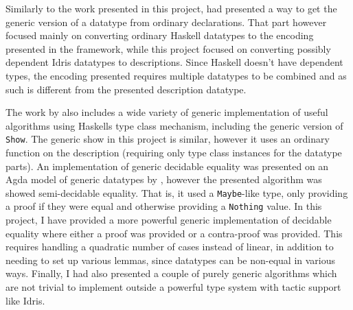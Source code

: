 \documentclass{ituthesis}
\newcommand{\ttconstructor}[1]{\textcolor{constructor-color}{\texttt{#1}}}
\newcommand{\tttype}[1]{\textcolor{type-color}{\texttt{#1}}}
\theoremstyle{break}
\begin{document}
Similarly to the work presented in this project, \citeauthor{magalhaes2012less} had presented a way to get the generic version of a datatype from ordinary declarations.
That part however focused mainly on converting ordinary Haskell datatypes to the encoding presented in the framework, while this project focused on converting possibly dependent Idris datatypes to descriptions.
Since Haskell doesn't have dependent types, the encoding presented requires multiple datatypes to be combined and as such is different from the presented description datatype.

The work by \citeauthor{magalhaes2012less} also includes a wide variety of generic implementation of useful algorithms using Haskells type class mechanism, including the generic version of \tttype{Show}.
The generic show in this project is similar, however it uses an ordinary function on the description (requiring only type class instances for the datatype parts).
An implementation of generic decidable equality was presented on an Agda model of generic datatypes by \citeauthor{magalhaes2012less}, however the presented algorithm was showed semi-decidable equality.
That is, it used a \tttype{Maybe}-like type, only providing a proof if they were equal and otherwise providing a \ttconstructor{Nothing} value.
In this project, I have provided a more powerful generic implementation of decidable equality where either a proof was provided or a contra-proof was provided.
This requires handling a quadratic number of cases instead of linear, in addition to needing to set up various lemmas, since datatypes can be non-equal in various ways.
Finally, I had also presented a couple of purely generic algorithms which are not trivial to implement outside a powerful type system with tactic support like Idris.
\end{document}
